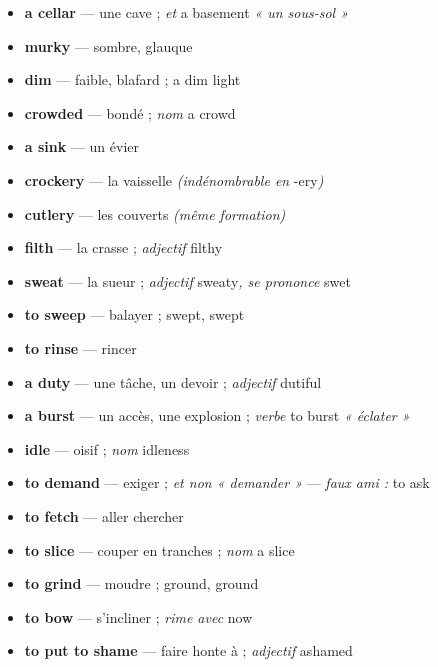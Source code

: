 \documentclass{fiche}
\begin{document}
\begin{itemize}[label=--,itemsep=0.8mm,leftmargin=*]\small
  \item \textbf{a cellar} — une cave ; \textit{et} a basement \textit{« un sous-sol »}
  \item \textbf{murky} — sombre, glauque
  \item \textbf{dim} — faible, blafard ; a dim light
  \item \textbf{crowded} — bondé ; \textit{nom} a crowd
  \item \textbf{a sink} — un évier
  \item \textbf{crockery} — la vaisselle \textit{(indénombrable en} -ery\textit{)}
  \item \textbf{cutlery} — les couverts \textit{(même formation)}
  \item \textbf{filth} — la crasse ; \textit{adjectif} filthy
  \item \textbf{sweat} — la sueur ; \textit{adjectif} sweaty\textit{, se prononce} swet
  \item \textbf{to sweep} — balayer ; swept, swept
  \item \textbf{to rinse} — rincer
  \item \textbf{a duty} — une tâche, un devoir ; \textit{adjectif} dutiful
  \item \textbf{a burst} — un accès, une explosion ; \textit{verbe} to burst \textit{« éclater »}
  \item \textbf{idle} — oisif ; \textit{nom} idleness
  \item \textbf{to demand} — exiger ; \textit{et non « demander »} --- \textit{faux ami :} to ask
  \item \textbf{to fetch} — aller chercher
  \item \textbf{to slice} — couper en tranches ; \textit{nom} a slice
  \item \textbf{to grind} — moudre ; ground, ground
  \item \textbf{to bow} — s'incliner ; \textit{rime avec} now
  \item \textbf{to put to shame} — faire honte à ; \textit{adjectif} ashamed
\end{itemize}
\end{document}
